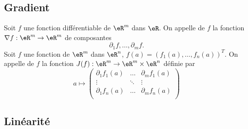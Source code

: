 

\subsection{Gradient}

\begin{definition}
	Soit $f$ une fonction différentiable de $\eR^m$ dans $\eR$. On appelle  de $f$ la fonction $\nabla f : \eR^m\to \eR^m$ de composantes
	\[
		\partial_{1}f,\ldots,\partial_{m}f.
	\]
	Soit $f$ une fonction de $\eR^m$ dans $\eR^n$, $f(a)=(f_1(a),\ldots,f_n(a))^T$. On appelle  de $f$ la fonction $J(f) : \eR^m\to \eR^m\times\eR^n$ définie par
	\begin{equation}
		a\mapsto  \begin{pmatrix}
			\partial_{1}f_1(a)  & \ldots & \partial_{m}f_1(a) \\
			\vdots              & \ddots & \vdots             \\
			\partial_{1}f_n (a) & \ldots & \partial_{m}f_n(a) \\
		\end{pmatrix}
	\end{equation}
\end{definition}

\subsection{Linéarité}

